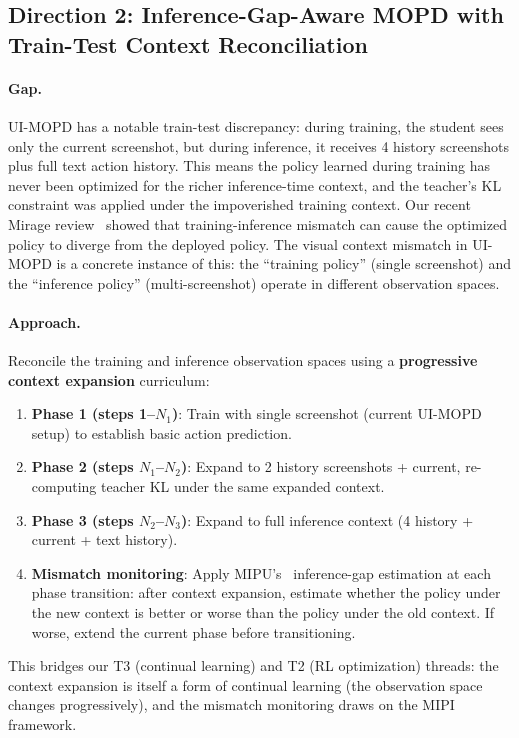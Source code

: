 \documentclass[11pt,a4paper]{article}
\begin{document}
\subsection{Direction 2: Inference-Gap-Aware MOPD with Train-Test Context Reconciliation}

\paragraph{Gap.} UI-MOPD has a notable train-test discrepancy: during training, the student sees only the current screenshot, but during inference, it receives 4 history screenshots plus full text action history. This means the policy learned during training has never been optimized for the richer inference-time context, and the teacher's KL constraint was applied under the impoverished training context. Our recent Mirage review~\cite{mirage2026} showed that training-inference mismatch can cause the optimized policy to diverge from the deployed policy. The visual context mismatch in UI-MOPD is a concrete instance of this: the ``training policy'' (single screenshot) and the ``inference policy'' (multi-screenshot) operate in different observation spaces.

\paragraph{Approach.} Reconcile the training and inference observation spaces using a \textbf{progressive context expansion} curriculum:
\begin{enumerate}
\item \textbf{Phase 1 (steps 1--$N_1$)}: Train with single screenshot (current UI-MOPD setup) to establish basic action prediction.
\item \textbf{Phase 2 (steps $N_1$--$N_2$)}: Expand to 2 history screenshots + current, re-computing teacher KL under the same expanded context.
\item \textbf{Phase 3 (steps $N_2$--$N_3$)}: Expand to full inference context (4 history + current + text history).
\item \textbf{Mismatch monitoring}: Apply MIPU's~\cite{mirage2026} inference-gap estimation at each phase transition: after context expansion, estimate whether the policy under the new context is better or worse than the policy under the old context. If worse, extend the current phase before transitioning.
\end{enumerate}
This bridges our T3 (continual learning) and T2 (RL optimization) threads: the context expansion is itself a form of continual learning (the observation space changes progressively), and the mismatch monitoring draws on the MIPI framework.
\end{document}
